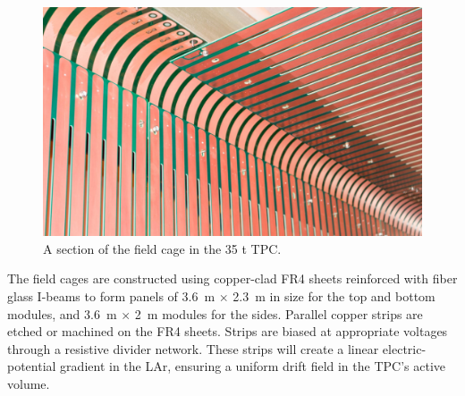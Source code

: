 



\begin{figure}[htb]
\centering
\includegraphics[width=.49\textwidth]{figures/TPC_FCA_1}
\caption{A section of the field cage in the 35 t TPC.}
\label{fig:tpc_fca_1}
\end{figure}    

   

The field cages are constructed using copper-clad FR4 sheets reinforced with fiber glass I-beams to form panels of 3.6~m $\times$ 2.3~m in size for the top and bottom modules, and 3.6~m $\times$ 2~m modules for the sides.  Parallel copper strips are etched or machined on the FR4 sheets.  Strips are biased at appropriate voltages through a resistive divider network. These strips will create a linear electric-potential gradient in the LAr, ensuring a uniform drift field in the TPC's active volume. 
 

